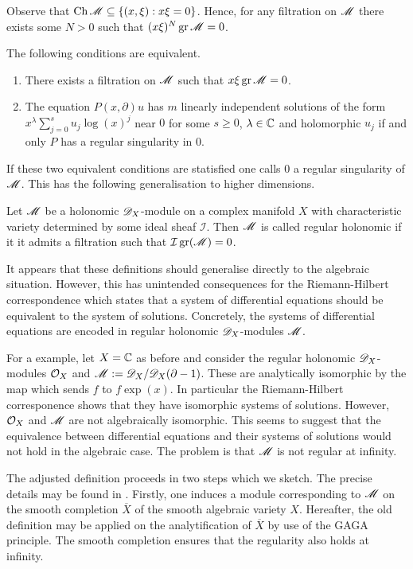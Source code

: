 Observe that $\operatorname{Ch} \mathscr{M}\subseteq \{(x,\xi): x\xi = 0\}$.
Hence, for any filtration on $\mathscr{M}$ there exists some $N>0$ such that
$(x\xi)^N \operatorname{gr}\mathscr{M} = 0 $.
\begin{proposition}
  The following conditions are equivalent.
  \begin{enumerate}
    \item There exists a filtration on $\mathscr{M}$ such that $x\xi\operatorname{gr}\mathscr{M} = 0$.
    \item The equation $P(x,\partial)u$ has $m$ linearly independent solutions of the form $x^\lambda \sum_{j=0}^s u_j \log(x)^j $
    near $0$ for some $s\geq 0$, $\lambda \in \mathbb{C}$ and holomorphic $u_j$ if and only $P$ has a regular singularity in $0$.
  \end{enumerate}
\end{proposition}
If these two equivalent conditions are statisfied one calls $0$ a regular singularity of $\mathscr{M}$.
This has the following generalisation to higher dimensions.
\begin{definition}
   Let $\mathscr{M}$ be a holonomic $\mathscr{D}_X$-module on a complex manifold $X$ with characteristic variety determined by some ideal sheaf $\mathcal{I}$. Then $\mathscr{M}$ is called regular holonomic if it it admits a filtration such that $\mathcal{I} \operatorname{gr}(\mathscr{M}) = 0$.
\end{definition}
It appears that these definitions should generalise directly to the algebraic situation.
However, this has unintended consequences for the Riemann-Hilbert correspondence which states that a system of differential equations should be equivalent to the system of solutions.
Concretely, the systems of differential equations are encoded in regular holonomic $\mathscr{D}_X$-modules $\mathscr{M}$.

For a example, let $X = \mathbb{C}$ as before and consider the regular holonomic $\mathscr{D}_X$-modules $\mathcal{O}_X$ and $\mathscr{M} := \mathscr{D}_X/\mathscr{D}_X(\partial - 1)$.
These are analytically isomorphic by the map which sends $f$ to $f\exp(x)$.
In particular the Riemann-Hilbert corresponence shows that they have isomorphic systems of solutions.
However, $\mathcal{O}_X$ and $\mathscr{M}$ are not algebraically isomorphic.
This seems to suggest that the equivalence between differential equations and their systems of solutions would not hold in the algebraic case.
The problem is that $\mathscr{M}$ is not regular at infinity.

 The adjusted definition proceeds in two steps which we sketch.
 The precise details may be found in \cite[Chapter 7]{borel1987algebraic}.
 Firstly, one induces a module corresponding to $\mathscr{M}$ on the smooth completion $\overline{X}$ of the smooth algebraic variety $X$.
 Hereafter, the old definition may be applied on the analytification of $\overline{X}$ by use of the GAGA principle.
 The smooth completion ensures that the regularity also holds at infinity.
